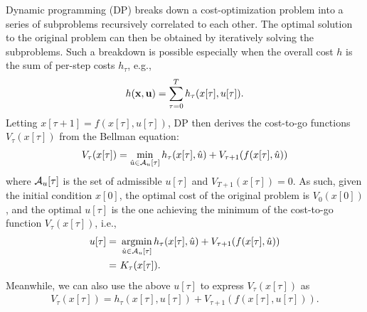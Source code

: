 Dynamic programming (DP) breaks down a cost-optimization problem into a series of subproblems recursively correlated to each other. The optimal solution to the original problem can then be obtained by iteratively solving the subproblems. Such a breakdown is possible especially when the overall cost $h$ is the sum of per-step costs $h_\tau$, e.g.,
\begin{align*}
h({\bf x},{\bf u}) = \sum\limits_{\tau=0}^T h_\tau(x[\tau],u[\tau]).
\end{align*}
Letting $x[\tau + 1] = f(x[\tau], u[\tau])$, DP then derives the cost-to-go functions $V_\tau(x[\tau])$ from the Bellman equation:
\begin{align*}
V_\tau(x[\tau]) = \min\limits_{\hat{u} \in \mathcal{A}_u[\tau]} h_\tau(x[\tau],\hat{u}) + V_{\tau + 1}(f(x[\tau],\hat{u}))
\end{align*}
where $\mathcal{A}_u[\tau]$ is the set of admissible $u[\tau]$ and $V_{T+1}(x[\tau]) = 0$. As such, given the initial condition $x[0]$, the optimal cost of the original problem is $V_0(x[0])$, and the optimal $u[\tau]$ is the one achieving the minimum of the cost-to-go function $V_\tau(x[\tau])$, i.e.,
\begin{align}
u[\tau] =&\ \operatorname*{argmin}\limits_{\hat{u} \in \mathcal{A}_u[\tau]} h_\tau(x[\tau],\hat{u}) + V_{\tau + 1}(f(x[\tau],\hat{u})) \nonumber \\
=&\ K_\tau(x[\tau]).
\label{eqn:DP-U}
\end{align}
Meanwhile, we can also use the above $u[\tau]$ to express $V_\tau(x[\tau])$ as
\begin{align}
V_\tau(x[\tau]) = h_\tau(x[\tau],u[\tau]) + V_{\tau + 1}(f(x[\tau],u[\tau])).
\label{eqn:DP-cost-to-go}
\end{align}







